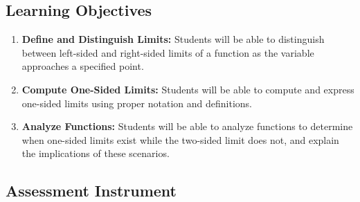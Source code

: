 \subsection{Learning Objectives}

\begin{enumerate}
    \item \textbf{Define and Distinguish Limits:} Students will be able to distinguish between left-sided and right-sided limits of a function as the variable approaches a specified point.
    \item \textbf{Compute One-Sided Limits:} Students will be able to compute and express one-sided limits using proper notation and definitions.
    \item \textbf{Analyze Functions:} Students will be able to analyze functions to determine when one-sided limits exist while the two-sided limit does not, and explain the implications of these scenarios.
\end{enumerate}

\subsection{Assessment Instrument}

